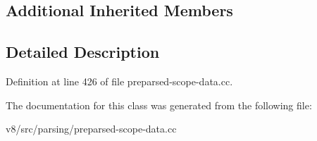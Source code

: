 \subsection*{Additional Inherited Members}


\subsection{Detailed Description}


Definition at line 426 of file preparsed-\/scope-\/data.\+cc.



The documentation for this class was generated from the following file\+:\begin{DoxyCompactItemize}
\item 
v8/src/parsing/preparsed-\/scope-\/data.\+cc\end{DoxyCompactItemize}
